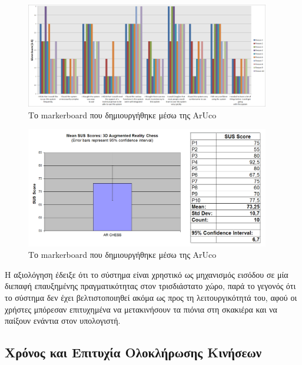 \begin{figure}[H]
    \centering
    \includegraphics[width=0.95\textwidth]{Files/Figures/sus_per_person.png}
    \caption[Το markerboard που δημιουργήθηκε μέσω της ArUco]{Το markerboard που δημιουργήθηκε μέσω της ArUco}
    \label{fig:markerboard}
\end{figure}


\begin{figure}[H]
    \centering
    \includegraphics[width=0.95\textwidth]{Files/Figures/sus.png}
    \caption[Το markerboard που δημιουργήθηκε μέσω της ArUco]{Το markerboard που δημιουργήθηκε μέσω της ArUco}
    \label{fig:markerboard}
\end{figure}


Η αξιολόγηση έδειξε ότι το σύστημα είναι χρηστικό ως μηχανισμός εισόδου σε μία διεπαφή επαυξημένης πραγματικότητας στον τρισδιάστατο χώρο, παρά το γεγονός ότι το σύστημα δεν έχει βελτιστοποιηθεί ακόμα ως προς τη λειτουργικότητά του, αφού οι χρήστες μπόρεσαν επιτυχημένα να μετακινήσουν τα πιόνια στη σκακιέρα και να παίξουν ενάντια στον υπολογιστή. 




\subsection{Χρόνος και Επιτυχία Ολοκλήρωσης Κινήσεων}


